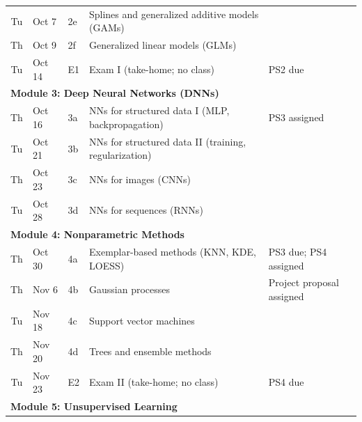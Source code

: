 \documentclass[11pt,twoside]{article}
\numberwithin{equation}{section}
\newcommand{\?}{\stackrel{?}{=}}
\begin{document}
\begin{table}[h!]
\begin{tabular}{cllll}
Tu       & Oct 7     & 2e      & Splines and generalized additive models (GAMs)        &                                \\
Th       & Oct 9     & 2f      & Generalized linear models (GLMs)                      &                               \\
\midrule
Tu     & Oct 14    & E1      & Exam I (take-home; no class)                          & PS2 due                                       \\%
\midrule
\multicolumn{4}{l}{\bf Module 3: Deep Neural Networks (DNNs)}                                                    \\\midrule
Th       & Oct 16    & 3a      & NNs for structured data I (MLP, backpropagation)             & PS3 assigned                             \\
Tu       & Oct 21    & 3b      & NNs for structured data II (training, regularization) &                                \\
Th       & Oct 23    & 3c      & NNs for images (CNNs)                                 &                                \\
Tu       & Oct 28    & 3d      & NNs for sequences (RNNs)                              &           \\
\midrule
\multicolumn{4}{l}{\bf Module 4:  Nonparametric Methods}                                                                  \\\midrule
Th       & Oct 30    & 4a      & Exemplar-based methods (KNN, KDE, LOESS)              & PS3 due; PS4 assigned      \\
Th       & Nov 6     & 4b      & Gaussian processes                                    & Project proposal assigned                               \\
Tu       & Nov 18    & 4c      & Support vector machines                               &                                \\
Th       & Nov 20    & 4d      & Trees and ensemble methods                            &               \\
\midrule
Tu       & Nov 23    &  E2     &  Exam II (take-home; no class)                        &  PS4 due  \\%
\midrule
\multicolumn{4}{l}{\bf Module 5: Unsupervised Learning}                                                               \\\midrule

\end{tabular}
\end{table}
\end{document}
